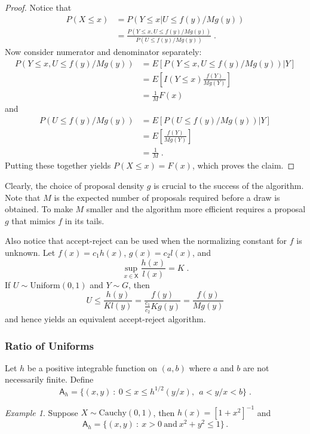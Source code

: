 \documentclass[12pt]{article}
\theoremstyle{plain}
\theoremstyle{definition}
\theoremstyle{remark}
\newtheorem{example}{Example}[section]
\newcommand{\sX}{\mathsf{X}}
\newcommand{\sA}{\mathsf{A}}
\begin{document}
\begin{proof}
Notice that
\begin{align*}
P(X \le x) & = P(Y \le x | U \le f(y) / M g(y)) \\
& =  \frac{P(Y \le x,  U \le f(y) / M g(y))}{P( U \le f(y) / M g(y)) }
\; .
\end{align*}
Now consider numerator and denominator separately:
\begin{align*}
P(Y \le x,  U \le f(y) / M g(y)) &= E \left[ P(Y \le x,  U \le f(y) / M
  g(y)) | Y \right] \\
& = E \left[ I(Y \le x) \frac{f(Y)}{M g(Y)} \right] \\
& = \frac{1}{M} F(x)
\end{align*}
and
\begin{align*}
P( U \le f(y) / M g(y)) & = E \left[P( U \le f(y) / M g(y)) | Y \right]\\
& = E \left[ \frac{f(Y)}{Mg(Y)} \right]\\
& = \frac{1}{M} \; .
\end{align*}
Putting these together yields $P(X \le x) = F(x)$, which
proves the claim.
\end{proof}

Clearly, the choice of proposal density $g$ is crucial to the success
of the algorithm.  Note that $M$ is the expected number of proposals
required before a draw is obtained.  To make $M$ smaller and the
algorithm more efficient requires a proposal $g$ that mimics $f$ in
its tails.

Also notice that accept-reject can be used when the normalizing
constant for $f$ is unknown.  Let $f(x) =c_1 h(x)$, $g(x) = c_2 l(x)$,
and
\[
\sup_{x \in \sX} \frac{h(x)}{l(x)} = K\; .
\]
If $U \sim \text{Uniform}(0,1)$ and $Y \sim G$, then 
\[
U \le \frac{h(y)}{Kl(y)} = \frac{f(y)}{\frac{c_1}{c_2} K g(y)} = \frac{f(y)}{M g(y)}
\]
and hence yields an equivalent accept-reject algorithm.

\subsubsection{Ratio of Uniforms}

Let $h$ be a positive integrable function on $(a,b)$ where $a$ and
$b$ are not necessarily finite.  Define
\begin{equation}
\label{gofmc:eq:rou region}
\sA_h = \{(x,y)~:~ 0 \le x \le h^{1/2}(y/x), ~~a < y/x < b \} \; .
\end{equation}

\begin{example}
\label{gofmc:ex:rou cauchy}
Suppose $X \sim \text{Cauchy}(0,1)$, then $h(x) = [1+x^2]^{-1}$ and
\[
\sA_h = \{(x,y)~:~ x > 0~\text{and}~x^2 + y^2 \le 1\}\, .
\]
\end{example}
\end{document}
